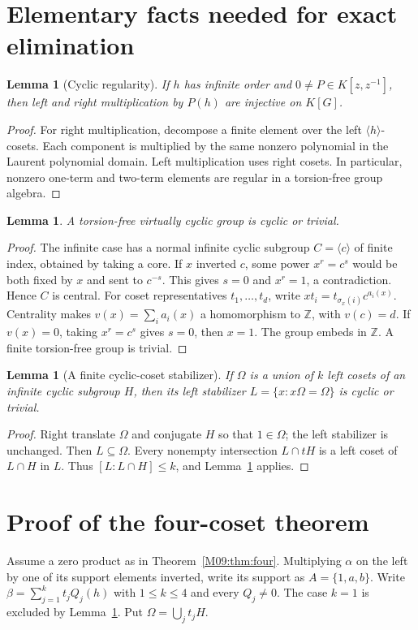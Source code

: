 \documentclass[11pt,a4paper,oneside]{report}
\newtheorem{lemma}[theorem]{Lemma}
\theoremstyle{definition}
\theoremstyle{remark}
\newcommand{\Z}{\mathbb Z}
\begin{document}
\section{Elementary facts needed for exact elimination}
\begin{lemma}[Cyclic regularity]\label{M09:lem:cyclic}
If $h$ has infinite order and $0\ne P\in K[z,z^{-1}]$, then left
and right multiplication by $P(h)$ are injective on $K[G]$.
\end{lemma}
\begin{proof}
For right multiplication, decompose a finite element over the left
$\langle h\rangle$-cosets. Each component is multiplied by the same
nonzero polynomial in the Laurent polynomial domain. Left
multiplication uses right cosets. In particular, nonzero one-term
and two-term elements are regular in a torsion-free group algebra.
\end{proof}

\begin{lemma}\label{M09:lem:vc}
A torsion-free virtually cyclic group is cyclic or trivial.
\end{lemma}
\begin{proof}
The infinite case has a normal infinite cyclic subgroup
$C=\langle c\rangle$ of finite index, obtained by taking a core.
If $x$ inverted $c$, some power $x^r=c^s$ would be both fixed by
$x$ and sent to $c^{-s}$. This gives $s=0$ and $x^r=1$, a
contradiction. Hence $C$ is central. For coset representatives
$t_1,\ldots,t_d$, write
$xt_i=t_{\sigma_x(i)}c^{a_i(x)}$. Centrality makes
$v(x)=\sum_i a_i(x)$ a homomorphism to $\Z$, with $v(c)=d$.
If $v(x)=0$, taking $x^r=c^s$ gives $s=0$, then $x=1$.
The group embeds in $\Z$. A finite torsion-free group is trivial.
\end{proof}

\begin{lemma}[A finite cyclic-coset stabilizer]\label{M09:lem:stab}
If $\Omega$ is a union of $k$ left cosets of an infinite cyclic
subgroup $H$, then its left stabilizer
$L=\{x:x\Omega=\Omega\}$ is cyclic or trivial.
\end{lemma}
\begin{proof}
Right translate $\Omega$ and conjugate $H$ so that $1\in\Omega$;
the left stabilizer is unchanged. Then $L\subseteq\Omega$.
Every nonempty intersection $L\cap tH$ is a left coset of
$L\cap H$ in $L$. Thus $[L:L\cap H]\le k$, and
Lemma~\ref{M09:lem:vc} applies.
\end{proof}

\section{Proof of the four-coset theorem}\label{M09:sec:four}
Assume a zero product as in Theorem~\ref{M09:thm:four}. Multiplying
$\alpha$ on the left by one of its support elements inverted,
write its support as $A=\{1,a,b\}$. Write
$\beta=\sum_{j=1}^k t_jQ_j(h)$ with $1\le k\le4$ and every
$Q_j\ne0$. The case $k=1$ is excluded by Lemma~\ref{M09:lem:cyclic}.
Put $\Omega=\bigcup_jt_jH$.
\end{document}
